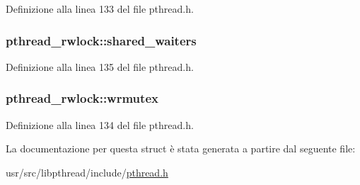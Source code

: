 Definizione alla linea 133 del file pthread.\+h.

\hypertarget{structpthread__rwlock_a513e968cb2dea01c044a3304c26b1d07}{
\subsubsection[{shared\+\_\+waiters}]{ pthread\+\_\+rwlock\+::shared\+\_\+waiters}}\label{structpthread__rwlock_a513e968cb2dea01c044a3304c26b1d07}


Definizione alla linea 135 del file pthread.\+h.

\hypertarget{structpthread__rwlock_acebaf123f0d451e8aa6e7734c6bcca5b}{
\subsubsection[{wrmutex}]{ pthread\+\_\+rwlock\+::wrmutex}}\label{structpthread__rwlock_acebaf123f0d451e8aa6e7734c6bcca5b}


Definizione alla linea 134 del file pthread.\+h.



La documentazione per questa struct è stata generata a partire dal seguente file\+:\begin{DoxyCompactItemize}
\item 
usr/src/libpthread/include/\hyperlink{pthread_8h}{pthread.\+h}\end{DoxyCompactItemize}
